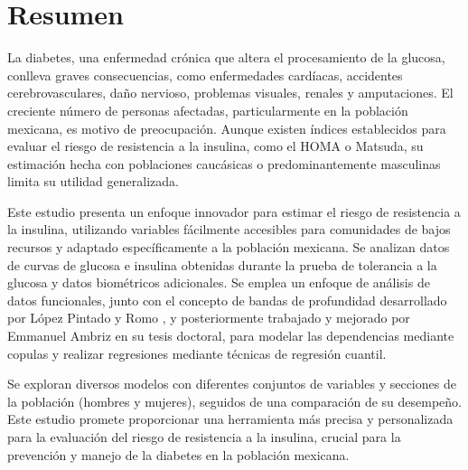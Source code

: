 \chapter*{Resumen}

La diabetes, una enfermedad crónica que altera el procesamiento de la glucosa, conlleva graves consecuencias, como enfermedades cardíacas, accidentes cerebrovasculares, daño nervioso, problemas visuales, renales y amputaciones. El creciente número de personas afectadas, particularmente en la población mexicana, es motivo de preocupación. Aunque existen índices establecidos para evaluar el riesgo de resistencia a la insulina, como el HOMA o Matsuda, su estimación hecha con poblaciones caucásicas o predominantemente masculinas limita su utilidad generalizada.

Este estudio presenta un enfoque innovador para estimar el riesgo de resistencia a la insulina, utilizando variables fácilmente accesibles para comunidades de bajos recursos y adaptado específicamente a la población mexicana. Se analizan datos de curvas de glucosa e insulina obtenidas durante la prueba de tolerancia a la glucosa y datos biométricos adicionales. Se emplea un enfoque de análisis de datos funcionales, junto con el concepto de bandas de profundidad desarrollado por López Pintado y Romo \cite{boxplotFun}, y posteriormente trabajado y mejorado por Emmanuel Ambriz en su tesis doctoral, para modelar las dependencias mediante copulas y realizar regresiones mediante técnicas de regresión cuantil.

Se exploran diversos modelos con diferentes conjuntos de variables y secciones de la población (hombres y mujeres), seguidos de una comparación de su desempeño. Este estudio promete proporcionar una herramienta más precisa y personalizada para la evaluación del riesgo de resistencia a la insulina, crucial para la prevención y manejo de la diabetes en la población mexicana.






